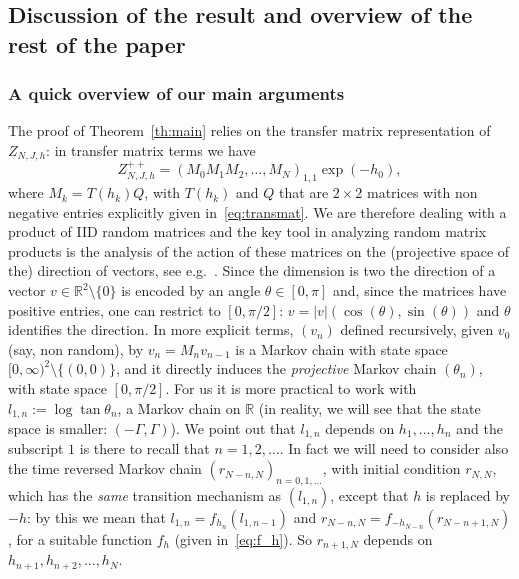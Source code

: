 \documentclass[AHL,Unicode,longabstracts,published]{cedram}
\newcommand{\bbR}{\mathbb{R}}
\newcommand{\gG}{\Gamma}
\begin{document}
\subsection{Discussion of the result and overview of the rest of the paper}\label{sec:overview}

\subsubsection{A quick overview of our main arguments}

The proof of Theorem~\ref{th:main} relies on the transfer matrix representation of $Z_{N, J, h}$: in transfer matrix terms we have
\begin{equation}
Z^{++}_{N, J, h}= (M_0M_1M_2,\dots, M_N)_{1,1}\exp\left(-h_0\right),
\end{equation}
where $M_k=T(h_k)Q$, with $T(h_k)$ and $Q$ that are $2\times 2$ matrices with non negative entries explicitly given in~\eqref{eq:transmat}. We are therefore dealing with a product of IID random matrices and the key tool in analyzing random matrix products is the analysis of the action of these matrices on the (projective space of the) direction of vectors, see e.g.~\cite{cf:Viana}. Since the dimension is two the direction of a vector $v\in \bbR^2\setminus \{0\}$ is encoded by an angle $\theta\in [0, \pi]$ and, since the matrices have positive entries, \linebreak one can restrict to $[0, \pi/2]$: $v = |v|(\cos(\theta), \sin(\theta))$ and $\theta$ identifies the direction. In more explicit terms, $(v_n)$ defined recursively, given $v_0$ (say, non random), by $v_{n}=M_{n} v_{n-1}$ is a Markov chain with state space $[0, \infty)^2\setminus \{(0,0)\}$, and it directly induces the \emph{projective} Markov chain $(\theta_n)$, with state space $[0,\pi/2]$. For us it is more practical to work with $l_{1, n}:= \log \tan\theta_n$, a Markov chain on $\bbR$ (in reality, we will see that the state space is smaller: $(-\gG, \gG)$). We point out that $l_{1,n}$ depends on $h_1, \dots, h_n$ and the subscript $1$ is there to recall that $n=1, 2, \dots$. In fact we will need to consider also the time reversed Markov chain $(r_{N-n, N})_{n=0,1, \dots}$, with initial condition $r_{N,N}$, which has the \emph{same} transition mechanism as $(l_{1,n})$, except that $h$ is replaced by $-h$: by this we mean that $l_{1, n}=f_{h_n}(l_{1, n-1})$ and $r_{N-n, N}=f_{-h_{N-n}}(r_{N- n+1, N})$, for a suitable function $f_h$ (given in~\eqref{eq:f_h}). So $r_{n+1, N}$ depends on $h_{n+1}, h_{n+2}, \dots, h_{N}$.
\end{document}
